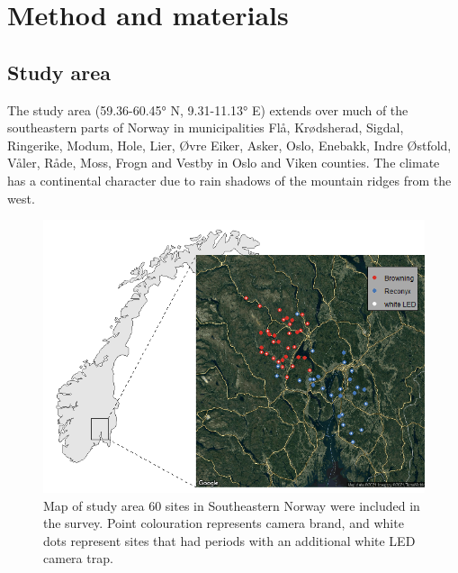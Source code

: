 \chapter{Method and materials}


\section{Study area} %


The study area (59.36-60.45° N, 9.31-11.13° E) extends over much of the southeastern parts of Norway in municipalities Flå, Krødsherad, Sigdal, Ringerike, Modum, Hole, Lier, Øvre Eiker, Asker, Oslo, Enebakk, Indre Østfold, Våler, Råde, Moss, Frogn and Vestby in Oslo and Viken counties. 
The climate has a continental character due to rain shadows of the mountain ridges from the west. 


\begin{figure}
\centering
\includegraphics[width=\textwidth]{../R/FLM_notebook_files/figure-gfm/study-map-1.png}
	\caption[Map of study area]
	{Map of study area  \small %
	60 sites in Southeastern Norway were included in the survey. Point colouration represents camera brand, and white dots represent sites that had periods with an additional white LED camera trap.}
\label{fig:map}
\end{figure}

